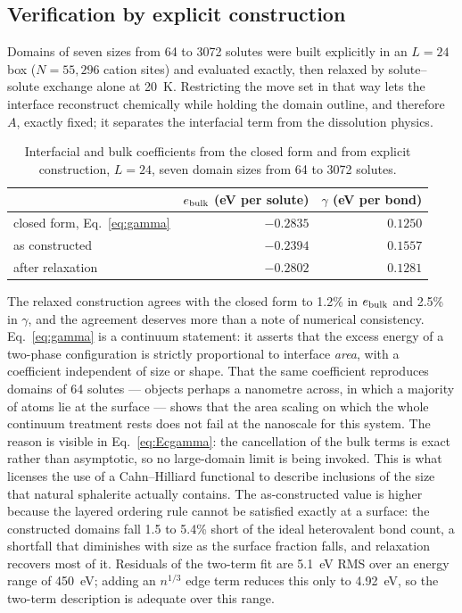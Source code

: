 \documentclass[11pt,a4paper]{article}
\begin{document}
\subsection{Verification by explicit construction}
\label{sec:gammaverify}

Domains of seven sizes from 64 to 3072 solutes were built explicitly in an
$L = 24$ box ($N = 55{,}296$ cation sites) and evaluated exactly, then relaxed
by solute--solute exchange alone at 20~K. Restricting the move set in that way
lets the interface reconstruct chemically while holding the domain outline, and
therefore $A$, exactly fixed; it separates the interfacial term from the
dissolution physics.

\begin{table}[htbp]
\centering
\caption{Interfacial and bulk coefficients from the closed form and from
explicit construction, $L = 24$, seven domain sizes from 64 to 3072 solutes.}
\label{tab:gamma}
\small
\begin{tabular}{lrr}
\toprule
& $e_{\rm bulk}$ (eV per solute) & $\gamma$ (eV per bond) \\
\midrule
closed form, Eq.~\eqref{eq:gamma} & $-0.2835$ & $0.1250$ \\
as constructed & $-0.2394$ & $0.1557$ \\
after relaxation & $-0.2802$ & $0.1281$ \\
\bottomrule
\end{tabular}
\end{table}

The relaxed construction agrees with the closed form to 1.2\% in $e_{\rm bulk}$
and 2.5\% in $\gamma$, and the agreement deserves more than a note of numerical
consistency. Eq.~\eqref{eq:gamma} is a continuum statement: it asserts that the
excess energy of a two-phase configuration is strictly proportional to interface
\emph{area}, with a coefficient independent of size or shape. That the same
coefficient reproduces domains of 64 solutes --- objects perhaps a nanometre
across, in which a majority of atoms lie at the surface --- shows that the area
scaling on which the whole continuum treatment rests does not fail at the
nanoscale for this system. The reason is visible in Eq.~\eqref{eq:Ecgamma}: the
cancellation of the bulk terms is exact rather than asymptotic, so no
large-domain limit is being invoked. This is what licenses the use of a
Cahn--Hilliard functional to describe inclusions of the size that natural
sphalerite actually contains. The as-constructed value is higher because the layered
ordering rule cannot be satisfied exactly at a surface: the constructed domains
fall 1.5 to 5.4\% short of the ideal heterovalent bond count, a shortfall that
diminishes with size as the surface fraction falls, and relaxation recovers most
of it. Residuals of the two-term fit are 5.1~eV RMS over an energy range of
450~eV; adding an $n^{1/3}$ edge term reduces this only to 4.92~eV, so the
two-term description is adequate over this range.
\end{document}
